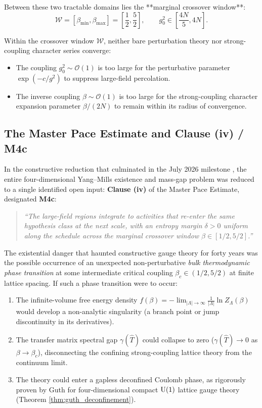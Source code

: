 Between these two tractable domains lies the **marginal crossover window**:
\begin{equation}
\label{eq:ch13_crossover_window_def}
\mathcal{W} = \left[ \beta_{\min}, \beta_{\max} \right] = \left[ \frac{1}{2}, \frac{5}{2} \right], \qquad g_0^2 \in \left[ \frac{4N}{5}, 4N \right].
\end{equation}

Within the crossover window $\mathcal{W}$, neither bare perturbation theory nor strong-coupling character series converge:
\begin{itemize}
    \item The coupling $g_0^2 \sim \mathcal{O}(1)$ is too large for the perturbative parameter $\exp(-c/g^2)$ to suppress large-field percolation.
    \item The inverse coupling $\beta \sim \mathcal{O}(1)$ is too large for the strong-coupling character expansion parameter $\beta / (2N)$ to remain within its radius of convergence.
\end{itemize}

\subsection{The Master Pace Estimate and Clause (iv) / M4c}
\label{subsec:master_pace_m4c}

In the constructive reduction that culminated in the July 2026 milestone \cite{OuladBrahim2026}, the entire four-dimensional Yang--Mills existence and mass-gap problem was reduced to a single identified open input: \textbf{Clause (iv)} of the Master Pace Estimate, designated \textbf{M4c}:
\begin{quote}
\emph{``The large-field regions integrate to activities that re-enter the same hypothesis class at the next scale, with an entropy margin $\delta > 0$ uniform along the schedule across the marginal crossover window $\beta \in [1/2, 5/2]$.''}
\end{quote}

The existential danger that haunted constructive gauge theory for forty years was the possible occurrence of an unexpected non-perturbative \emph{bulk thermodynamic phase transition} at some intermediate critical coupling $\beta_c \in (1/2, 5/2)$ at finite lattice spacing. If such a phase transition were to occur:
\begin{enumerate}
    \item The infinite-volume free energy density $f(\beta) = -\lim_{|\Lambda|\to\infty} \frac{1}{|\Lambda|} \ln Z_\Lambda(\beta)$ would develop a non-analytic singularity (a branch point or jump discontinuity in its derivatives).
    \item The transfer matrix spectral gap $\gamma(\hat{T})$ could collapse to zero ($\gamma(\hat{T}) \to 0$ as $\beta \to \beta_c$), disconnecting the confining strong-coupling lattice theory from the continuum limit.
    \item The theory could enter a gapless deconfined Coulomb phase, as rigorously proven by Guth \cite{Guth1980} for four-dimensional compact $\mathrm{U}(1)$ lattice gauge theory (Theorem \ref{thm:guth_deconfinement}).
\end{enumerate}

